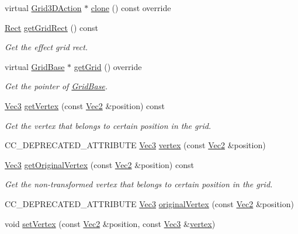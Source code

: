 \begin{DoxyCompactItemize}
virtual \hyperlink{classGrid3DAction}{Grid3\+D\+Action} $\ast$ \hyperlink{classGrid3DAction_a01d5b2d60654ef66d6551ac2190ed14c}{clone} () const override
\item 
\hyperlink{classRect}{Rect} \hyperlink{classGrid3DAction_a5e488a9ee6a5605725f01a8a30a55975}{get\+Grid\+Rect} () const
\begin{DoxyCompactList}\small\item\em Get the effect grid rect. \end{DoxyCompactList}\item 
virtual \hyperlink{classGridBase}{Grid\+Base} $\ast$ \hyperlink{classGrid3DAction_a9b03fb743c9ba963d361b87ce975a642}{get\+Grid} () override
\begin{DoxyCompactList}\small\item\em Get the pointer of \hyperlink{classGridBase}{Grid\+Base}. \end{DoxyCompactList}\item 
\hyperlink{classVec3}{Vec3} \hyperlink{classGrid3DAction_a188dfc79a323f07b3aff441bced64201}{get\+Vertex} (const \hyperlink{classVec2}{Vec2} \&position) const
\begin{DoxyCompactList}\small\item\em Get the vertex that belongs to certain position in the grid. \end{DoxyCompactList}\item 
C\+C\+\_\+\+D\+E\+P\+R\+E\+C\+A\+T\+E\+D\+\_\+\+A\+T\+T\+R\+I\+B\+U\+TE \hyperlink{classVec3}{Vec3} \hyperlink{classGrid3DAction_a75b5c44d0729a43476dff9ab6e7b281c}{vertex} (const \hyperlink{classVec2}{Vec2} \&position)
\item 
\hyperlink{classVec3}{Vec3} \hyperlink{classGrid3DAction_a8e614d5c3c368b1f2eee4a3e885f861f}{get\+Original\+Vertex} (const \hyperlink{classVec2}{Vec2} \&position) const
\begin{DoxyCompactList}\small\item\em Get the non-\/transformed vertex that belongs to certain position in the grid. \end{DoxyCompactList}\item 
C\+C\+\_\+\+D\+E\+P\+R\+E\+C\+A\+T\+E\+D\+\_\+\+A\+T\+T\+R\+I\+B\+U\+TE \hyperlink{classVec3}{Vec3} \hyperlink{classGrid3DAction_aa9ab3e0d2e07ab0a8227bbbd9c0b2021}{original\+Vertex} (const \hyperlink{classVec2}{Vec2} \&position)
\item 
void \hyperlink{classGrid3DAction_a110cf4db66e0410d971d9f47e116fdbf}{set\+Vertex} (const \hyperlink{classVec2}{Vec2} \&position, const \hyperlink{classVec3}{Vec3} \&\hyperlink{classGrid3DAction_a75b5c44d0729a43476dff9ab6e7b281c}{vertex})

\end{DoxyCompactItemize}
